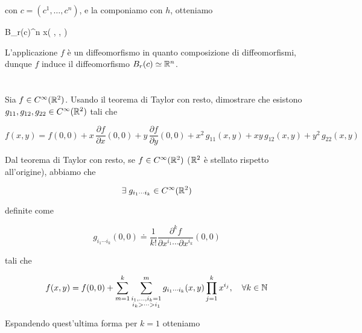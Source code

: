 con $ c = (c^{1},\dots,c^{n}) $, e la componiamo con $ h $, otteniamo

%
	{B_{r}(c)}{\R^{n}}%
	{x}{\left( , \cdots,  \right)}

L'applicazione $ f $ è un diffeomorfismo in quanto composizione di diffeomorfismi, dunque $ f $ induce il diffeomorfismo $ B_{r}(c) \simeq \mathbb{R}^{n} $.

\tocless\section{}\label{es1-5}

\begin{tcolorbox}
	Sia $ f \in C^{\infty}(\mathbb{R}^{2}) $. Usando il teorema di Taylor con resto, dimostrare che esistono $ g_{11},g_{12},g_{22} \in C^{\infty}(\mathbb{R}^{2}) $ tali che
	
	\begin{equation}
		f(x,y) = f(0,0) + x \, \dfrac{\partial f}{\partial x} (0,0) + y \, \dfrac{\partial f}{\partial y} (0,0) + x^{2} \, g_{11}(x,y) + x y \, g_{12}(x,y) + y^{2} \, g_{22}(x,y)
	\end{equation}
\end{tcolorbox}

Dal teorema di Taylor con resto, se $ f \in C^{\infty} (\mathbb{R}^{2}) $ ($ \mathbb{R}^{2} $ è stellato rispetto all'origine), abbiamo che

\begin{equation}
	\exists \; g_{i_{1} \cdots i_{k}} \in C^{\infty} (\mathbb{R}^{2})
\end{equation}

definite come

\begin{equation}
	g_{i_{1} \cdots i_{k}} (0,0) \doteq \dfrac{1}{k!} \dfrac{\partial^{k} f}{\partial x^{i_{1}} \cdots \partial x^{i_{k}}} (0,0)
\end{equation}

tali che

\begin{equation}
	f(x,y) = f(0,0) + \sum_{m=1}^{k} \sum_{\substack{i_{1},\dots,i_{k}=1 \\ {i_{k}} > \cdots > i_{1}}}^{m} g_{i_{1} \cdots i_{k}} (x,y) \prod_{j=1}^{k} x^{i_{j}} \qcomma \forall k \in \N
\end{equation}

Espandendo quest'ultima forma per $ k=1 $ otteniamo

